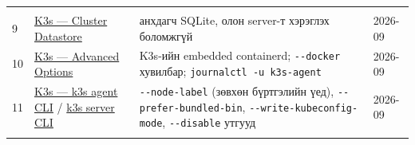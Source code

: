 \begin{longtable}[]{@{}llll@{}}
\begin{minipage}[t]{0.22\columnwidth}
\end{minipage}\tabularnewline
\begin{minipage}[t]{0.22\columnwidth}\raggedright
9\strut
\end{minipage} & \begin{minipage}[t]{0.22\columnwidth}\raggedright
\href{https://docs.k3s.io/datastore}{K3s --- Cluster Datastore}\strut
\end{minipage} & \begin{minipage}[t]{0.22\columnwidth}\raggedright
анхдагч SQLite, олон server-т хэрэглэх боломжгүй\strut
\end{minipage} & \begin{minipage}[t]{0.22\columnwidth}\raggedright
2026-09\strut
\end{minipage}\tabularnewline
\begin{minipage}[t]{0.22\columnwidth}\raggedright
10\strut
\end{minipage} & \begin{minipage}[t]{0.22\columnwidth}\raggedright
\href{https://docs.k3s.io/advanced}{K3s --- Advanced Options}\strut
\end{minipage} & \begin{minipage}[t]{0.22\columnwidth}\raggedright
K3s-ийн embedded containerd; \texttt{-\/-docker} хувилбар; \texttt{journalctl\ -u\ k3s-agent}\strut
\end{minipage} & \begin{minipage}[t]{0.22\columnwidth}\raggedright
2026-09\strut
\end{minipage}\tabularnewline
\begin{minipage}[t]{0.22\columnwidth}\raggedright
11\strut
\end{minipage} & \begin{minipage}[t]{0.22\columnwidth}\raggedright
\href{https://docs.k3s.io/cli/agent}{K3s --- k3s agent CLI} / \href{https://docs.k3s.io/cli/server}{k3s server CLI}\strut
\end{minipage} & \begin{minipage}[t]{0.22\columnwidth}\raggedright
\texttt{-\/-node-label} (зөвхөн бүртгэлийн үед), \texttt{-\/\allowbreak{}-prefer-bundled-bin}, \texttt{-\/\allowbreak{}-write-kubeconfig-mode}, \texttt{-\/-disable} утгууд\strut
\end{minipage} & \begin{minipage}[t]{0.22\columnwidth}\raggedright
2026-09\strut
\end{minipage}\tabularnewline
\begin{minipage}[t]{0.22\columnwidth}\raggedright

\end{minipage}
\end{longtable}
